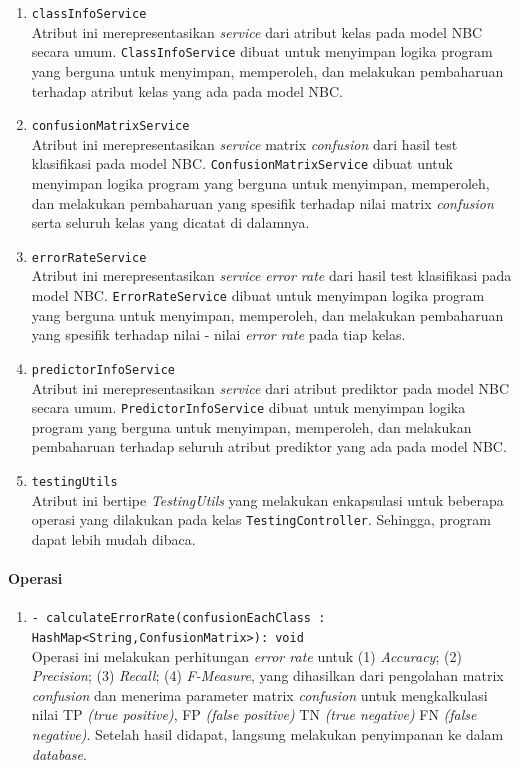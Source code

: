 \begin{enumerate}
\begin{enumerate}
			\item \texttt{classInfoService}\\
			Atribut ini merepresentasikan \textit{service} dari atribut kelas pada model NBC secara umum. \texttt{ClassInfoService} dibuat untuk menyimpan logika program yang berguna untuk menyimpan, memperoleh, dan melakukan pembaharuan terhadap atribut kelas yang ada pada model NBC.

			\item \texttt{confusionMatrixService}\\
			Atribut ini merepresentasikan \textit{service} matrix \textit{confusion} dari hasil test klasifikasi pada model NBC. \texttt{ConfusionMatrixService} dibuat untuk menyimpan logika program yang berguna untuk menyimpan, memperoleh, dan melakukan pembaharuan yang spesifik terhadap nilai matrix \textit{confusion} serta seluruh kelas yang dicatat di dalamnya.

			\item \texttt{errorRateService}\\
			Atribut ini merepresentasikan \textit{service} \textit{error rate} dari hasil test klasifikasi pada model NBC. \texttt{ErrorRateService} dibuat untuk menyimpan logika program yang berguna untuk menyimpan, memperoleh, dan melakukan pembaharuan yang spesifik terhadap nilai - nilai \textit{error rate} pada tiap kelas.

			\item \texttt{predictorInfoService}\\
			Atribut ini merepresentasikan \textit{service} dari atribut prediktor pada model NBC secara umum. \texttt{PredictorInfoService} dibuat untuk menyimpan logika program yang berguna untuk menyimpan, memperoleh, dan melakukan pembaharuan terhadap seluruh atribut prediktor yang ada pada model NBC.

			\item \texttt{testingUtils}\\
			Atribut ini bertipe \textit{TestingUtils} yang melakukan enkapsulasi untuk beberapa operasi yang dilakukan pada kelas \texttt{TestingController}. Sehingga, program dapat lebih mudah dibaca.

		\end{enumerate}
		
	\paragraph{Operasi}
		\begin{enumerate}
			\item \texttt{- calculateErrorRate(confusionEachClass : HashMap<String,ConfusionMatrix>): void}\\
			Operasi ini melakukan perhitungan \textit{error rate} untuk (1) \textit{Accuracy}; (2) \textit{Precision}; (3) \textit{Recall}; (4) \textit{F-Measure}, yang dihasilkan dari pengolahan matrix \textit{confusion} dan menerima parameter matrix \textit{confusion} untuk mengkalkulasi nilai TP \textit{(true positive)}, FP \textit{(false positive)} TN \textit{(true negative)} FN \textit{(false negative)}. Setelah hasil didapat,  langsung melakukan penyimpanan ke dalam \textit{database}.
			

\end{enumerate}
\end{enumerate}
